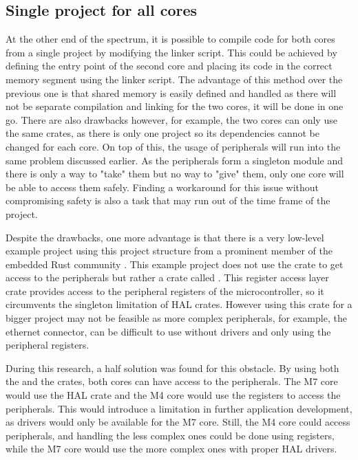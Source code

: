 \subsection{Single project for all cores}

At the other end of the spectrum, it is possible to compile code for both cores from a single project by modifying the linker script. This could be achieved by defining the entry point of the second core and placing its code in the correct memory segment using the  linker script. The advantage of this method over the previous one is that shared memory is easily defined and handled as there will not be separate compilation and linking for the two cores, it will be done in one go. There are also drawbacks however, for example, the two cores can only use the same crates, as there is only one project so its dependencies cannot be changed for each core. On top of this, the usage of peripherals will run into the same problem discussed earlier. As the peripherals form a singleton module and there is only a way to "take" them but no way to "give" them, only one core will be able to access them safely. Finding a workaround for this issue without compromising safety is also a task that may run out of the time frame of the project.

Despite the drawbacks, one more advantage is that there is a very low-level example project using this project structure from a prominent member of the embedded Rust community \cite{DualCoreDemo}. This example project does not use the  crate to get access to the peripherals but rather a crate called . This register access layer crate provides access to the peripheral registers of the microcontroller, so it circumvents the singleton limitation of HAL crates. However using this crate for a bigger project may not be feasible as more complex peripherals, for example, the ethernet connector, can be difficult to use without drivers and only using the peripheral registers.

During this research, a half solution was found for this obstacle. By using both the  and the  crates, both cores can have access to the peripherals. The M7 core would use the HAL crate and the M4 core would use the registers to access the peripherals. This would introduce a limitation in further application development, as drivers would only be available for the M7 core. Still, the M4 core could access peripherals, and handling the less complex ones could be done using registers, while the M7 core would use the more complex ones with proper HAL drivers.

